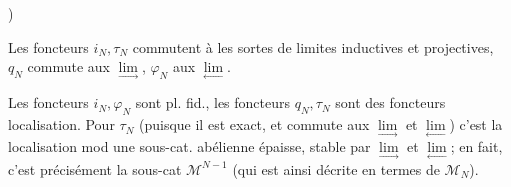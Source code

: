 \uline{})

Les foncteurs $i_N,\tau_N$ commutent à  les sortes de limites inductives et projectives, $q_N$ commute aux $\underset{\longrightarrow}{\lim}$, $\varphi_N$ aux $\underset{\longleftarrow}{\lim}$.

Les foncteurs $i_N,\varphi_N$ sont pl. fid., les foncteurs $q_N,\tau_N$ sont des foncteurs localisation.  Pour $\tau_N$ (puisque il est exact, et commute aux $\underset{\longrightarrow}{\lim}$ et $\underset{\longleftarrow}{\lim}$) c'est la localisation mod une sous-cat. abélienne épaisse, stable par $\underset{\longrightarrow}{\lim}$ et $\underset{\longleftarrow}{\lim}$; en fait, c'est précisément la sous-cat $\mathcal M^{N-1}$ (qui est ainsi décrite  en termes de $\mathcal M_N$).

